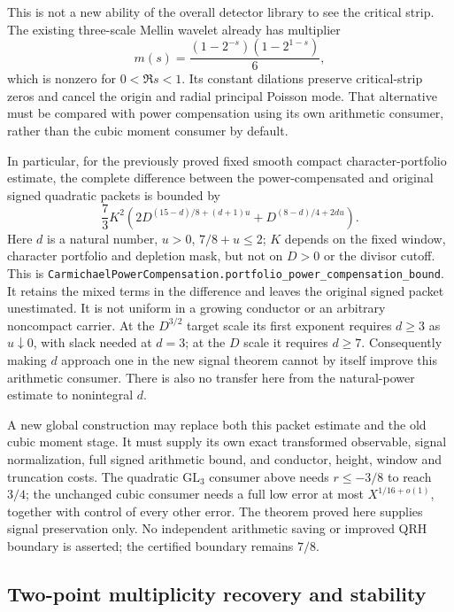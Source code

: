 This is not a new ability of the overall detector library to see the
critical strip. The existing three-scale Mellin wavelet already has
multiplier
\[
 m(s)=\frac{(1-2^{-s})(1-2^{1-s})}{6},
\]
which is nonzero for \(0<\Re s<1\). Its constant dilations preserve
critical-strip zeros and cancel the origin and radial principal
Poisson mode. That alternative must be compared with power compensation
using its own arithmetic consumer, rather than the cubic moment
consumer by default.

In particular, for the previously proved fixed smooth compact
character-portfolio estimate, the complete difference between the
power-compensated and original signed quadratic packets is bounded by
\[
 \frac73 K^2\left(
  2D^{(15-d)/8+(d+1)u}+D^{(8-d)/4+2du}\right).
\]
Here \(d\) is a natural number, \(u>0\), \(7/8+u\le2\);
\(K\) depends on the fixed window, character portfolio and depletion
mask, but not on \(D>0\) or the divisor cutoff. This is
\texttt{CarmichaelPowerCompensation.portfolio\_power\_compensation\_bound}.
It retains the mixed terms in the difference and leaves the original
signed packet unestimated. It is not uniform in a growing conductor
or an arbitrary noncompact carrier. At the \(D^{3/2}\) target scale its
first exponent requires \(d\ge3\) as \(u\downarrow0\), with slack
needed at \(d=3\); at the \(D\) scale it requires \(d\ge7\).
Consequently making \(d\) approach one in the new signal theorem cannot
by itself improve this arithmetic consumer. There is also no transfer
here from the natural-power estimate to nonintegral \(d\).

A new global construction may replace both this packet estimate and
the old cubic moment stage. It must supply its own exact transformed
observable, signal normalization, full signed arithmetic bound, and
conductor, height, window and truncation costs. The quadratic
\(\mathrm{GL}_3\) consumer above needs \(r\le-3/8\) to reach \(3/4\);
the unchanged cubic consumer needs a full low error at most
\(X^{1/16+o(1)}\), together with control of every other error.
The theorem proved here supplies signal preservation only. No
independent arithmetic saving or improved QRH boundary is asserted;
the certified boundary remains \(7/8\).

\subsection{Two-point multiplicity recovery and stability}
\label{sec:power-multiplicity-recovery}

